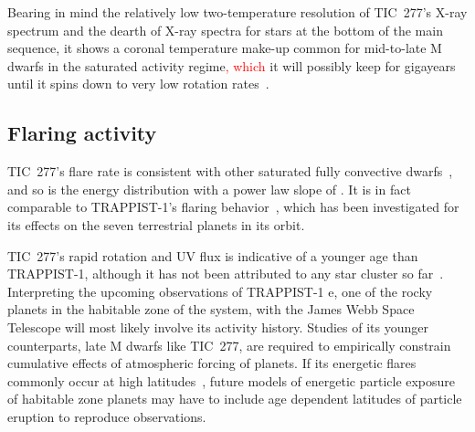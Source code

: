 \documentclass[twocolumn]{aastex631}
\begin{document}
Bearing in mind the relatively low two-temperature resolution of TIC~277's X-ray spectrum and the dearth of X-ray spectra for stars at the bottom of the main sequence, it shows a coronal temperature make-up common for mid-to-late M dwarfs in the saturated activity regime\textcolor{red}{, which} it will possibly keep for gigayears until it spins down to very low rotation rates~\citep{medina2022galactic, engle2023living}. 

\subsection{Flaring activity}
\label{sec:discussion:flares}

TIC~277's flare rate is consistent with other saturated fully convective dwarfs~\citep{medina2020flare, murray2022study}, and so is the energy distribution with a power law slope of \ffdalpha\unskip. It is in fact comparable to TRAPPIST-1's flaring behavior~\citep{paudel2018k2}, which has been investigated for its effects on the seven terrestrial planets in its orbit. 


TIC~277's rapid rotation and UV flux is indicative of a younger age than TRAPPIST-1, although it has not been attributed to any star cluster so far~\citep{schneider2018hazmat}. Interpreting the upcoming observations of TRAPPIST-1 e, one of the rocky planets in the habitable zone of the system, with the James Webb Space Telescope will most likely involve its activity history. Studies of its younger counterparts, late M dwarfs like TIC~277, are required to empirically constrain cumulative effects of atmospheric forcing of planets. If its energetic flares commonly occur at high latitudes~\citep{ilin2021giant}, future models of energetic particle exposure of habitable zone planets may have to include age dependent latitudes of particle eruption to reproduce observations. 
\end{document}
